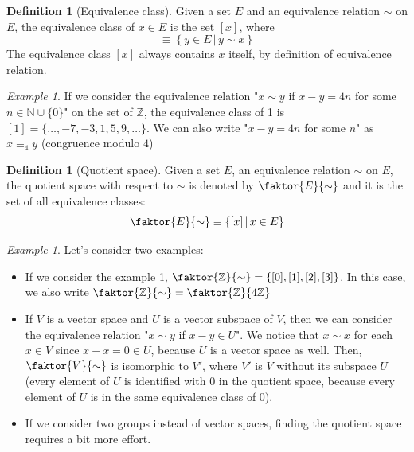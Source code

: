 \documentclass[a4paper,11pt,titlepage]{article}
\numberwithin{equation}{section}
\theoremstyle{definition}
\newtheorem{definition}[theorem]{Definition}
\theoremstyle{remark}
\newtheorem{example}[theorem]{Example}
\begin{document}
\begin{definition}[Equivalence class]
  Given a set $E$ and an equivalence relation $\sim$ on $E$, the equivalence class of $x \in E$ is the set $[x]$, where
  \begin{equation}
    [x] \equiv \left \{ y \in E \,|\, y \sim x \right \}
  \end{equation}
  The equivalence class $[x]$ always contains $x$ itself, by definition of equivalence relation.
\end{definition}

\begin{example} \label{modulo4ex}
  If we consider the equivalence relation "$x \sim y$ if $x-y = 4n$ for some $n \in \mathbb{N} \cup \{0\}$" on the set of $\mathbb{Z}$, the equivalence class of 1 is $[1] = \{\ldots, -7, -3, 1, 5, 9, \ldots\}$. We can also write "$x-y = 4n$ for some $n$" as $x \equiv_4 y$ (congruence modulo $4$)
\end{example}

\begin{definition}[Quotient space]
  Given a set $E$, an equivalence relation $\sim$ on $E$, the quotient space with respect to $\sim$ is denoted by $\faktor{E}{\sim}$ and it is the set of all equivalence classes:
  \begin{equation}
     \faktor{E}{\sim} \equiv \left \{ [x] \,|\, x \in E \right \}
  \end{equation}
\end{definition}

\begin{example} \label{quotientexample}
  Let's consider two examples:
  \begin{itemize}
    \item If we consider the example \ref{modulo4ex}, $\faktor{\mathbb{Z}}{\sim} = \{[0], [1], [2], [3]\}$. In this case, we also write $\faktor{\mathbb{Z}}{\sim} = \faktor{\mathbb{Z}}{4\mathbb{Z}}$
    \item If $V$ is a vector space and $U$ is a vector subspace of $V$, then we can consider the equivalence relation "$x \sim y$ if $x-y \in U$". We notice that $x \sim x$ for each $x \in V$ since $x-x = 0 \in U$, because $U$ is a vector space as well. Then, $\faktor{V}{\sim}$ is isomorphic to $V'$, where $V'$ is $V$ without its subspace $U$ (every element of $U$ is identified with 0 in the quotient space, because every element of $U$ is in the same equivalence class of 0).
    \item If we consider two groups instead of vector spaces, finding the quotient space requires a bit more effort.
  \end{itemize}
\end{example}
\newpage
\end{document}
